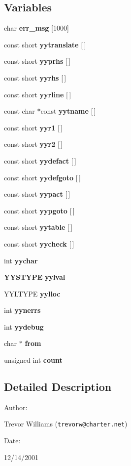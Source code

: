 \subsection*{Variables}
\begin{CompactItemize}
\item 
char {\bf err\_\-msg} [1000]
\item 
const short {\bf yytranslate} [$\,$]
\item 
const short {\bf yyprhs} [$\,$]
\item 
const short {\bf yyrhs} [$\,$]
\item 
const short {\bf yyrline} [$\,$]
\item 
const char $\ast$const {\bf yytname} [$\,$]
\item 
const short {\bf yyr1} [$\,$]
\item 
const short {\bf yyr2} [$\,$]
\item 
const short {\bf yydefact} [$\,$]
\item 
const short {\bf yydefgoto} [$\,$]
\item 
const short {\bf yypact} [$\,$]
\item 
const short {\bf yypgoto} [$\,$]
\item 
const short {\bf yytable} [$\,$]
\item 
const short {\bf yycheck} [$\,$]
\item 
int {\bf yychar}
\item 
{\bf YYSTYPE} {\bf yylval}
\item 
YYLTYPE {\bf yylloc}
\item 
int {\bf yynerrs}
\item 
int {\bf yydebug}
\item 
char $\ast$ {\bf from}
\item 
unsigned int {\bf count}
\end{CompactItemize}


\subsection{Detailed Description}


\begin{Desc}
\item[Author: ]\par
Trevor Williams ({\tt trevorw@charter.net}) \end{Desc}
\begin{Desc}
\item[Date: ]\par
12/14/2001\end{Desc}


